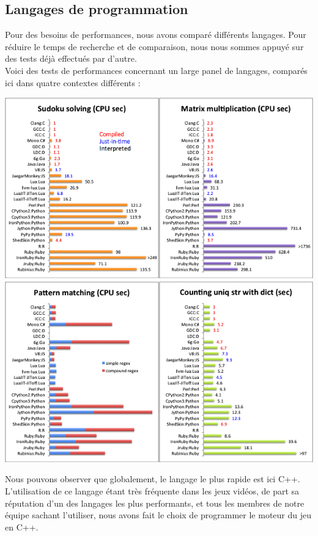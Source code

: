 \documentclass[a4paper]{article}
\newcommand{\alinea}{\hspace*{0.5cm}}
\begin{document}
      \subsection{Langages de programmation}
        \alinea Pour des besoins de performances, nous avons comparé différents langages. Pour réduire le temps de recherche et de comparaison, nous nous sommes appuyé sur des tests déjà effectués par d'autre.\\
        \alinea Voici des tests de performances concernant un large panel de langages, comparés ici dans quatre contextes différents :\\
        \begin{center}
          \includegraphics[scale=0.5]{AnalyseLangage1.png}
          \includegraphics[scale=0.5]{AnalyseLangage2.png} 
        \end{center}
        \alinea Nous pouvons observer que globalement, le langage le plus rapide est ici C++. L'utilisation de ce langage étant très fréquente dans les jeux vidéos, de part sa réputation d'un des langages les plus performants, et tous les membres de notre équipe sachant l'utiliser, nous avons fait le choix de programmer le moteur du jeu en C++.\\
\end{document}
